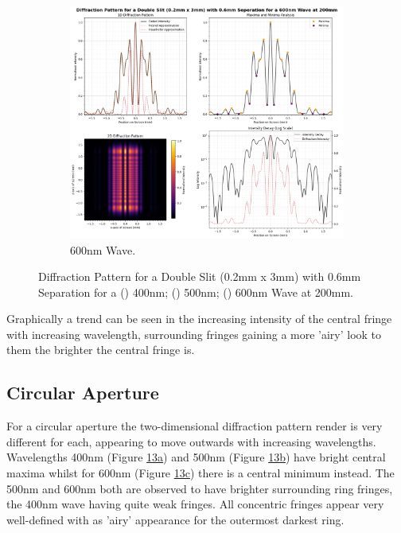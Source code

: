 \documentclass[12pt]{article}
\begin{document}
\begin{figure}[H]\ContinuedFloat
    \centering
    \begin{subfigure}[b]{.48\textwidth}
        \centering
        \includegraphics[width=\linewidth]{dslit_600nm.png}
        \caption{600nm Wave.}
        \label{fig:12c}
    \end{subfigure}
    \caption{Diffraction Pattern for a Double Slit (0.2mm x 3mm) with 0.6mm Separation for a () 400nm; () 500nm; () 600nm Wave at 200mm.}
    \label{fig:12}
\end{figure}

Graphically a trend can be seen in the increasing intensity of the central fringe with increasing wavelength, surrounding fringes gaining a more 'airy' look to them the brighter the central fringe is.

\subsection{Circular Aperture}

For a circular aperture the two-dimensional diffraction pattern render is very different for each, appearing to move outwards with increasing wavelengths. Wavelengths 400nm (Figure \hyperref[fig:13a]{13a}) and 500nm (Figure \hyperref[fig:13b]{13b}) have bright central maxima whilst
for 600nm (Figure \hyperref[fig:13c]{13c}) there is a central minimum instead. The 500nm and 600nm both are observed to have brighter surrounding ring fringes, the 400nm wave having quite weak fringes. All concentric fringes appear
very well-defined with as 'airy' appearance for the outermost darkest ring.
\end{document}
